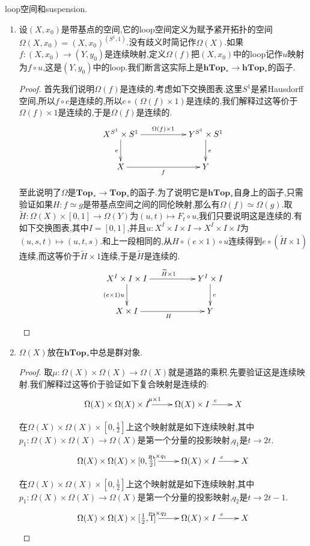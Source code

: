 loop空间和suspension.
\begin{enumerate}
	\item 设$(X,x_0)$是带基点的空间,它的loop空间定义为赋予紧开拓扑的空间$\Omega(X,x_0)=(X,x_0)^{(S^1,1)}$.没有歧义时简记作$\Omega(X)$.如果$f:(X,x_0)\to(Y,y_0)$是连续映射,定义$\Omega(f)$把$(X,x_0)$中的loop记作$u$映射为$f\circ u$,这是$(Y,y_0)$中的loop.我们断言这实际上是$\textbf{hTop}_*\to\textbf{hTop}_*$的函子.
	\begin{proof}
		
		首先我们说明$\Omega(f)$是连续的.考虑如下交换图表.这里$S^1$是紧Hausdorff空间,所以$f\circ e$是连续的,所以$e\circ(\Omega(f)\times1)$是连续的,我们解释过这等价于$\Omega(f)\times1$是连续的,于是$\Omega(f)$是连续的.
		$$\xymatrix{X^{S^1}\times S^1\ar[rr]^{\Omega(f)\times1}\ar[d]_e&&Y^{S^1}\times S^1\ar[d]^e\\X\ar[rr]_f&&Y}$$
		
		至此说明了$\Omega$是$\textbf{Top}_*\to\textbf{Top}_*$的函子.为了说明它是$\textbf{hTop}_*$自身上的函子,只需验证如果$H:f\simeq g$是带基点空间之间的同伦映射,那么有$\Omega(f)\simeq\Omega(g)$.取$\widetilde{H}:\Omega(X)\times[0,1]\to\Omega(Y)$为$(u,t)\mapsto F_t\circ u$,我们只要说明这是连续的.有如下交换图表,其中$I=[0,1]$,并且$u:X^I\times I\times I\to X^I\times I\times I$为$(u,s,t)\mapsto(u,t,s)$.和上一段相同的,从$H\circ(e\times1)\circ u$连续得到$e\circ(\widetilde{H}\times1)$连续,而这等价于$\widetilde{H}\times1$连续,于是$\widetilde{H}$是连续的.
		$$\xymatrix{X^I\times I\times I\ar[rr]^{\widetilde{H}\times1}\ar[d]_{(e\times1)u}&&Y^I\times I\ar[d]^e\\X\times I\ar[rr]_H&&Y}$$
	\end{proof}
    \item $\Omega(X)$放在$\textbf{hTop}_*$中总是群对象.
    \begin{proof}
    	
    	取$\mu:\Omega(X)\times\Omega(X)\to\Omega(X)$就是道路的乘积.先要验证这是连续映射.我们解释过这等价于验证如下复合映射是连续的:
    	$$\xymatrix{\Omega(X)\times\Omega(X)\times I\ar[r]^{\mu\times1}&\Omega(X)\times I\ar[r]^e&X}$$
    	
    	在$\Omega(X)\times\Omega(X)\times[0,\frac{1}{2}]$上这个映射就是如下连续映射,其中$p_1:\Omega(X)\times\Omega(X)\to\Omega(X)$是第一个分量的投影映射,$q_1$是$t\to2t$.
    	$$\xymatrix{\Omega(X)\times\Omega(X)\times[0,\frac{1}{2}]\ar[r]^{p_1\times q_1}&\Omega(X)\times I\ar[r]^e&X}$$
    	
    	在$\Omega(X)\times\Omega(X)\times[0,\frac{1}{2}]$上这个映射就是如下连续映射,其中$p_1:\Omega(X)\times\Omega(X)\to\Omega(X)$是第一个分量的投影映射,$q_2$是$t\to2t-1$.
    	$$\xymatrix{\Omega(X)\times\Omega(X)\times[\frac{1}{2},1]\ar[r]^{p_2\times q_2}&\Omega(X)\times I\ar[r]^e&X}$$
    	

\end{proof}
\end{enumerate}
